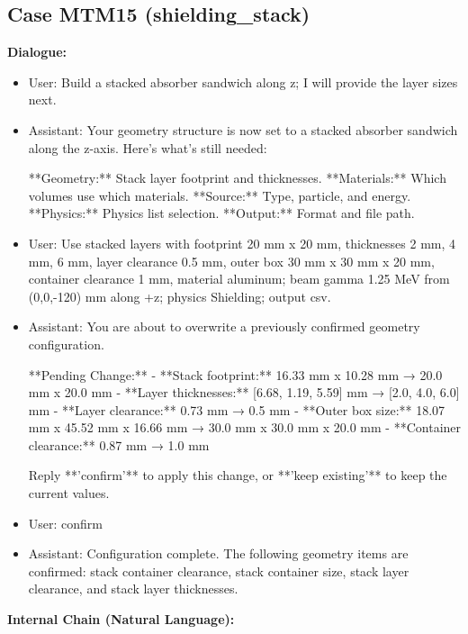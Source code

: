 \documentclass[11pt]{ctexart}
\begin{document}
\subsection{Case MTM15 (shielding\_stack)}
\textbf{Dialogue:}
\begin{itemize}
\item User: Build a stacked absorber sandwich along z; I will provide the layer sizes next.
\item Assistant: Your geometry structure is now set to a stacked absorber sandwich along the z-axis. Here's what's still needed:

**Geometry:** Stack layer footprint and thicknesses.
**Materials:** Which volumes use which materials.
**Source:** Type, particle, and energy.
**Physics:** Physics list selection.
**Output:** Format and file path.
\item User: Use stacked layers with footprint 20 mm x 20 mm, thicknesses 2 mm, 4 mm, 6 mm, layer clearance 0.5 mm, outer box 30 mm x 30 mm x 20 mm, container clearance 1 mm, material aluminum; beam gamma 1.25 MeV from (0,0,-120) mm along +z; physics Shielding; output csv.
\item Assistant: You are about to overwrite a previously confirmed geometry configuration.

**Pending Change:**
- **Stack footprint:** 16.33 mm x 10.28 mm → 20.0 mm x 20.0 mm
- **Layer thicknesses:** [6.68, 1.19, 5.59] mm → [2.0, 4.0, 6.0] mm
- **Layer clearance:** 0.73 mm → 0.5 mm
- **Outer box size:** 18.07 mm x 45.52 mm x 16.66 mm → 30.0 mm x 30.0 mm x 20.0 mm
- **Container clearance:** 0.87 mm → 1.0 mm

Reply **'confirm'** to apply this change, or **'keep existing'** to keep the current values.
\item User: confirm
\item Assistant: Configuration complete. The following geometry items are confirmed: stack container clearance, stack container size, stack layer clearance, and stack layer thicknesses.
\end{itemize}
\textbf{Internal Chain (Natural Language):}
\end{document}
